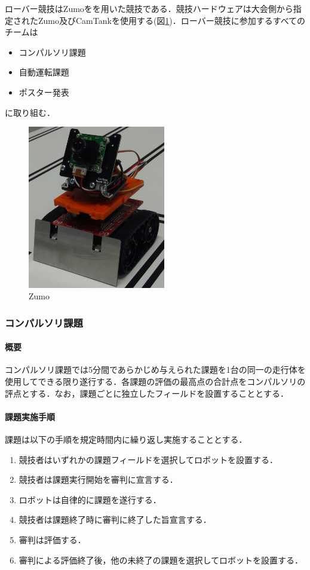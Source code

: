 \documentclass[submit]{ipsj}
\begin{document}
ローバー競技はZumoをを用いた競技である．競技ハードウェアは大会側から指定されたZumo及びCamTankを使用する(図\ref{fig:zumo})．ローバー競技に参加するすべてのチームは
\begin{itemize}
\item コンパルソリ課題
\item 自動運転課題
\item ポスター発表
\end{itemize}
に取り組む．

\begin{figure}[b]
\centering
\includegraphics[width=6cm]{images/zumo.jpg}
\caption{Zumo} \label{fig:zumo}
\end{figure}

\subsubsection{コンパルソリ課題}

\paragraph*{概要}
コンパルソリ課題では5分間であらかじめ与えられた課題を1台の同一の走行体を使用してできる限り遂行する．各課題の評価の最高点の合計点をコンパルソリの評点とする．なお，課題ごとに独立したフィールドを設置することとする．

\paragraph*{課題実施手順}
課題は以下の手順を規定時間内に繰り返し実施することとする．
\begin{enumerate}
\item 競技者はいずれかの課題フィールドを選択してロボットを設置する．
\item 競技者は課題実行開始を審判に宣言する．
\item ロボットは自律的に課題を遂行する．
\item 競技者は課題終了時に審判に終了した旨宣言する．
\item 審判は評価する．
\item 審判による評価終了後，他の未終了の課題を選択してロボットを設置する．
\end{enumerate}
\end{document}
